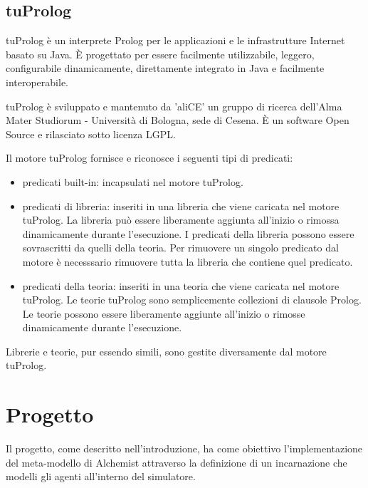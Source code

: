 \documentclass[12pt,a4paper,openright,twoside]{report}
\begin{document}
\section{tuProlog}
tuProlog \`e un interprete Prolog per le applicazioni e le infrastrutture Internet basato su Java. \`E progettato per essere facilmente utilizzabile, leggero, configurabile dinamicamente, direttamente integrato in Java e facilmente interoperabile.

tuProlog \`e sviluppato e mantenuto da 'aliCE' un gruppo di ricerca dell'Alma Mater Studiorum - Universit\`a di Bologna, sede di Cesena. \`E un software Open Source e rilasciato sotto licenza LGPL.

Il motore tuProlog fornisce e riconosce i seguenti tipi di predicati:
\begin{itemize}
  \item predicati built-in: incapsulati nel motore tuProlog.
  \item predicati di libreria: inseriti in una libreria che viene caricata nel motore tuProlog. La libreria pu\`o essere liberamente aggiunta all'inizio o rimossa dinamicamente durante l'esecuzione. I predicati della libreria possono essere sovrascritti da quelli della teoria. Per rimuovere un singolo predicato dal motore \`e necesssario rimuovere tutta la libreria che contiene quel predicato.
  \item predicati della teoria: inseriti in una teoria che viene caricata nel motore tuProlog. Le teorie tuProlog sono semplicemente collezioni di clausole Prolog. Le teorie possono essere liberamente aggiunte all'inizio o rimosse dinamicamente durante l'esecuzione.
\end{itemize}

Librerie e teorie, pur essendo simili, sono gestite diversamente dal motore tuProlog.


\chapter{Progetto}
\lhead[\fancyplain{}{\bfseries\thepage}]{\fancyplain{}{\bfseries\rightmark}}

Il progetto, come descritto nell'introduzione, ha come obiettivo l'implementazione del meta-modello di Alchemist attraverso la definizione di un incarnazione che modelli gli agenti all'interno del simulatore.
\end{document}
